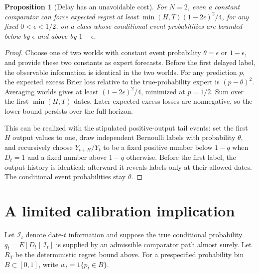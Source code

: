 \documentclass[11pt]{article}
\newtheorem{proposition}[theorem]{Proposition}
\theoremstyle{remark}
\begin{document}
\begin{proposition}[Delay has an unavoidable cost]
For $N=2$, even a constant comparator can force expected regret at least
$\min(H,T)(1-2\epsilon)^2/4$, for any fixed $0<\epsilon<1/2$, on a class whose conditional event probabilities are bounded below by $\epsilon$ and above by $1-\epsilon$.
\end{proposition}
\begin{proof}
Choose one of two worlds with constant event probability $\theta=\epsilon$ or $1-\epsilon$, and provide these two constants as expert forecasts. Before the first delayed label, the observable information is identical in the two worlds. For any prediction $p$, the expected excess Brier loss relative to the true-probability expert is $(p-\theta)^2$. Averaging worlds gives at least $(1-2\epsilon)^2/4$, minimized at $p=1/2$. Sum over the first $\min(H,T)$ dates. Later expected excess losses are nonnegative, so the lower bound persists over the full horizon.

This can be realized with the stipulated positive-output tail events: set the first $H$ output values to one, draw independent Bernoulli labels with probability $\theta$, and recursively choose $Y_{t+H}/Y_t$ to be a fixed positive number below $1-q$ when $D_t=1$ and a fixed number above $1-q$ otherwise. Before the first label, the output history is identical; afterward it reveals labels only at their allowed dates. The conditional event probabilities stay $\theta$.
\end{proof}

\section*{A limited calibration implication}
Let $\mathcal I_t$ denote date-$t$ information and suppose the true conditional probability $q_t=E[D_t\mid\mathcal I_t]$ is supplied by an admissible comparator path almost surely. Let $R_T$ be the deterministic regret bound above. For a prespecified probability bin $B\subset[0,1]$, write $w_t=1\{p_t\in B\}$.
\end{document}
